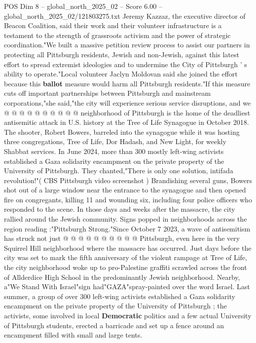 \begin{textsample}{POS Dim 8 – global\_north\_2025\_02 – Score 6.00 – global\_north\_2025\_02/121803275.txt}
Jeremy Kazzaz, the executive director of Beacon Coalition, said their work and their volunteer infrastructure is a testament to the strength of grassroots activism and the power of strategic coordination."We built a massive petition review process to assist our partners in protecting all Pittsburgh residents, Jewish and non-Jewish, against this latest effort to spread extremist ideologies and to undermine the City of Pittsburgh ' s ability to operate."Local volunteer Jaclyn Moldovan said she joined the effort because this \textbf{ballot} measure would harm all Pittsburgh residents."If this measure cuts off important partnerships between Pittsburgh and mainstream corporations,"she said,"the city will experience serious service disruptions, and we @ @ @ @ @ @ @ @ @ @ neighborhood of Pittsburgh is the home of the deadliest antisemitic attack in U.S. history at the Tree of Life Synagogue in October 2018.
The shooter, Robert Bowers, barreled into the synagogue while it was hosting three congregations, Tree of Life, Dor Hadash, and New Light, for weekly Shabbat services.
In June 2024, more than 300 mostly left-wing activists established a Gaza solidarity encampment on the private property of the University of Pittsburgh.
They chanted,"There is only one solution, intifada revolution!"( CBS Pittsburgh video screenshot ) Brandishing several guns, Bowers shot out of a large window near the entrance to the synagogue and then opened fire on congregants, killing 11 and wounding six, including four police officers who responded to the scene.
In those days and weeks after the massacre, the city rallied around the Jewish community.
Signs popped in neighborhoods across the region reading :"Pittsburgh Strong."Since October 7 2023, a wave of antisemitism has struck not just @ @ @ @ @ @ @ @ @ @ Pittsburgh, even here in the very Squirrel Hill neighborhood where the massacre has occurred.
Just days before the city was set to mark the fifth anniversary of the violent rampage at Tree of Life, the city neighborhood woke up to pro-Palestine graffiti scrawled across the front of Allderdice High School in the predominantly Jewish neighborhood.
Nearby, a"We Stand With Israel"sign had"GAZA"spray-painted over the word Israel.
Last summer, a group of over 300 left-wing activists established a Gaza solidarity encampment on the private property of the University of Pittsburgh ; the activists, some involved in local \textbf{Democratic} politics and a few actual University of Pittsburgh students, erected a barricade and set up a fence around an encampment filled with small and large tents.

\end{textsample}
